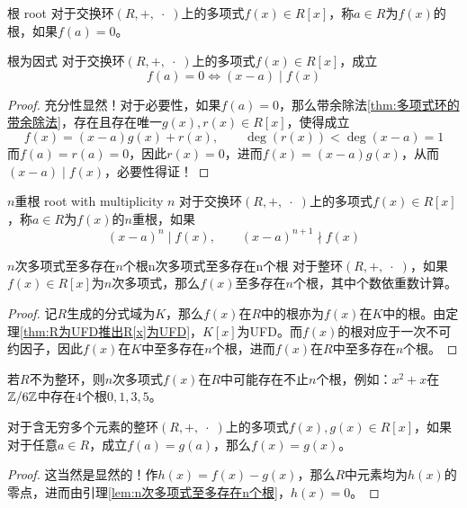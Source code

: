 \begin{definition}{根 root}
	对于交换环$(R,+,\;\cdot \;)$上的多项式$f(x)\in R[x]$，称$a\in R$为$f(x)$的根，如果$f(a)=0$。
\end{definition}

\begin{proposition}{}{根为因式}
	对于交换环$(R,+,\;\cdot \;)$上的多项式$f(x)\in R[x]$，成立%
	$$
	f(a)=0\iff
	(x-a)\mid f(x)
	$$
\end{proposition}

\begin{proof}
	充分性显然！对于必要性，如果$f(a)=0$，那么带余除法\ref{thm:多项式环的带余除法}，存在且存在唯一$g(x),r(x)\in R[x]$，使得成立%
	$$
	f(x)=(x-a)g(x)+r(x),\qquad
	\deg(r(x))<\deg(x-a)=1
	$$
	而$f(a)=r(a)=0$，因此$r(x)=0$，进而$f(x)=(x-a)g(x)$，从而$(x-a)\mid f(x)$，必要性得证！
\end{proof}

\begin{definition}{$n$重根 root with multiplicity $n$}
	对于交换环$(R,+,\;\cdot \;)$上的多项式$f(x)\in R[x]$，称$a\in R$为$f(x)$的$n$重根，如果%
	$$
	(x-a)^n\mid f(x),\qquad 
	(x-a)^{n+1}\nmid f(x)
	$$
\end{definition}

\begin{lemma}{$n$次多项式至多存在$n$个根}{n次多项式至多存在n个根}
	对于整环$(R,+,\;\cdot \;)$，如果$f(x)\in R[x]$为$n$次多项式，那么$f(x)$至多存在$n$个根，其中个数依重数计算。
\end{lemma}

\begin{proof}
	记$R$生成的分式域为$K$，那么$f(x)$在$R$中的根亦为$f(x)$在$K$中的根。由定理\ref{thm:R为UFD推出R[x]为UFD}，$K[x]$为UFD。而$f(x)$的根对应于一次不可约因子，因此$f(x)$在$K$中至多存在$n$个根，进而$f(x)$在$R$中至多存在$n$个根。
\end{proof}

\begin{remark}
	若$R$不为整环，则$n$次多项式$f(x)$在$R$中可能存在不止$n$个根，例如：$x^2+x$在$\mathbb{Z}/6\mathbb{Z}$中存在$4$个根$0,1,3,5$。
\end{remark}

\begin{corollary}
	对于含无穷多个元素的整环$(R,+,\;\cdot \;)$上的多项式$f(x),g(x)\in R[x]$，如果对于任意$a\in R$，成立$f(a)=g(a)$，那么$f(x)=g(x)$。
\end{corollary}

\begin{proof}
	这当然是显然的！作$h(x)=f(x)-g(x)$，那么$R$中元素均为$h(x)$的零点，进而由引理\ref{lem:n次多项式至多存在n个根}，$h(x)=0$。
\end{proof}

